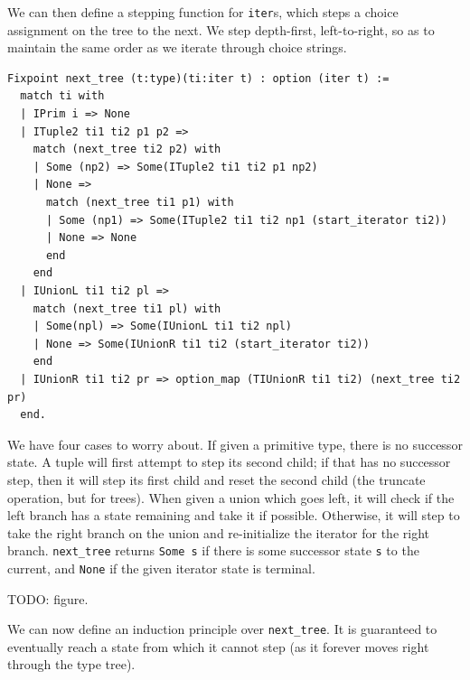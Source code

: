 \documentclass[a4paper,english]{lipics-v2019}
\begin{document}
We can then define a stepping function for \verb|iter|s, which
steps a choice assignment on the tree to the next. We step depth-first,
left-to-right, so as to maintain the same order as we iterate through 
choice strings.

\begin{verbatim}
Fixpoint next_tree (t:type)(ti:iter t) : option (iter t) :=
  match ti with
  | IPrim i => None
  | ITuple2 ti1 ti2 p1 p2 =>
    match (next_tree ti2 p2) with
    | Some (np2) => Some(ITuple2 ti1 ti2 p1 np2)
    | None =>
      match (next_tree ti1 p1) with
      | Some (np1) => Some(ITuple2 ti1 ti2 np1 (start_iterator ti2))
      | None => None
      end
    end
  | IUnionL ti1 ti2 pl =>
    match (next_tree ti1 pl) with
    | Some(npl) => Some(IUnionL ti1 ti2 npl)
    | None => Some(IUnionR ti1 ti2 (start_iterator ti2))
    end
  | IUnionR ti1 ti2 pr => option_map (TIUnionR ti1 ti2) (next_tree ti2 pr)
  end.
\end{verbatim}

We have four cases to worry about. If given a primitive type, there is no
successor state. A tuple will first attempt to step its second child; if  that
has no successor step, then it will step its first child and reset the second
child (the truncate operation, but for trees). When given a union which goes
left, it will check if the left branch has a state remaining and take it if
possible. Otherwise, it will step to take the right branch on the union and
re-initialize the iterator for the right branch. \verb|next_tree| returns
\verb|Some s| if there is some successor state \verb|s| to the current, and
\verb|None| if the given iterator state is terminal.

TODO: figure.

We can now define an induction principle over \verb|next_tree|. It is guaranteed
to eventually reach a state from which it cannot step (as it forever moves right
through the type tree). 
\end{document}
